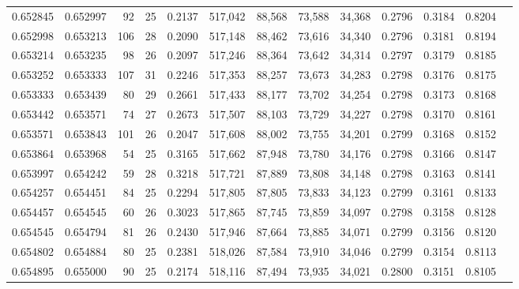 \begin{tabular}{rrrrrrrrrrrrr}
0.652845 & 0.652997 &     92 &    25 &                                     0.2137 & 517,042 &  88,568 &  73,588 &  34,368 & 0.2796 & 0.3184 & 0.8204 \\
0.652998 & 0.653213 &    106 &    28 &                                     0.2090 & 517,148 &  88,462 &  73,616 &  34,340 & 0.2796 & 0.3181 & 0.8194 \\
0.653214 & 0.653235 &     98 &    26 &                                     0.2097 & 517,246 &  88,364 &  73,642 &  34,314 & 0.2797 & 0.3179 & 0.8185 \\
0.653252 & 0.653333 &    107 &    31 &                                     0.2246 & 517,353 &  88,257 &  73,673 &  34,283 & 0.2798 & 0.3176 & 0.8175 \\
0.653333 & 0.653439 &     80 &    29 &                                     0.2661 & 517,433 &  88,177 &  73,702 &  34,254 & 0.2798 & 0.3173 & 0.8168 \\
0.653442 & 0.653571 &     74 &    27 &                                     0.2673 & 517,507 &  88,103 &  73,729 &  34,227 & 0.2798 & 0.3170 & 0.8161 \\
0.653571 & 0.653843 &    101 &    26 &                                     0.2047 & 517,608 &  88,002 &  73,755 &  34,201 & 0.2799 & 0.3168 & 0.8152 \\
0.653864 & 0.653968 &     54 &    25 &                                     0.3165 & 517,662 &  87,948 &  73,780 &  34,176 & 0.2798 & 0.3166 & 0.8147 \\
0.653997 & 0.654242 &     59 &    28 &                                     0.3218 & 517,721 &  87,889 &  73,808 &  34,148 & 0.2798 & 0.3163 & 0.8141 \\
0.654257 & 0.654451 &     84 &    25 &                                     0.2294 & 517,805 &  87,805 &  73,833 &  34,123 & 0.2799 & 0.3161 & 0.8133 \\
0.654457 & 0.654545 &     60 &    26 &                                     0.3023 & 517,865 &  87,745 &  73,859 &  34,097 & 0.2798 & 0.3158 & 0.8128 \\
0.654545 & 0.654794 &     81 &    26 &                                     0.2430 & 517,946 &  87,664 &  73,885 &  34,071 & 0.2799 & 0.3156 & 0.8120 \\
0.654802 & 0.654884 &     80 &    25 &                                     0.2381 & 518,026 &  87,584 &  73,910 &  34,046 & 0.2799 & 0.3154 & 0.8113 \\
0.654895 & 0.655000 &     90 &    25 &                                     0.2174 & 518,116 &  87,494 &  73,935 &  34,021 & 0.2800 & 0.3151 & 0.8105 \\

\end{tabular}
